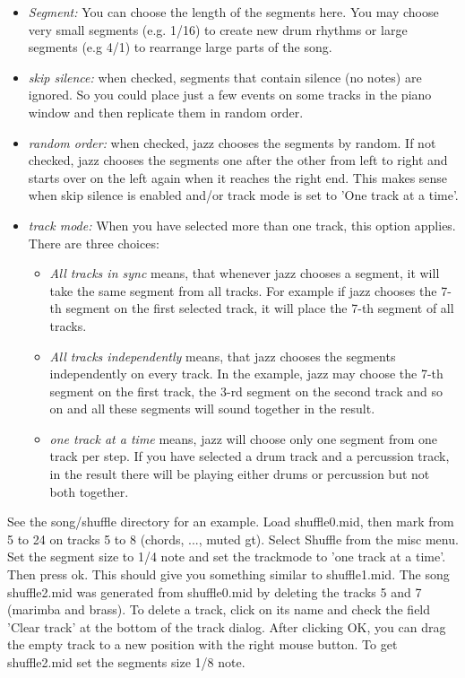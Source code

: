 \documentclass[letterpaper]{report}
\begin{document}
\begin{itemize}

\item {\em Segment:} You can choose the length of the segments here. You may
choose very small segments (e.g. 1/16) to create new drum rhythms or large
segments (e.g 4/1) to rearrange large parts of the song.

\item {\em skip silence:} when checked, segments that contain silence (no notes)
are ignored. So you could place just a few events on some tracks in the piano
window and then replicate them in random order.

\item {\em random order:} when checked, jazz chooses the segments by random. If
not checked, jazz chooses the segments one after the other from left to right
and starts over on the left again when it reaches the right end. This makes
sense when skip silence is enabled and/or track mode is set to
'One track at a time'.

\item {\em track mode:} When you have selected more than one track, this
option applies. There are three choices:

\begin{itemize}

\item {\em All tracks in sync} means, that whenever jazz chooses a segment,
it will take the same segment from all tracks. For example if jazz chooses
the 7-th segment on the first selected track, it will place the 7-th segment
of all tracks.

\item {\em All tracks independently} means, that jazz chooses the segments
independently on every track. In the example, jazz may choose the 7-th
segment on the first track, the 3-rd segment on the second track and so on
and all these segments will sound together in the result.

\item {\em one track at a time} means, jazz will choose only one
segment from one track per step. If you have selected a drum track and
a percussion track, in the result there will be playing either drums or
percussion but not both together.

\end{itemize}

\end{itemize}


See the song/shuffle directory for an example. Load shuffle0.mid, then mark
from 5 to 24 on tracks 5 to 8 (chords, ..., muted gt). Select Shuffle from
the misc menu. Set the segment size to 1/4 note and set the trackmode to 'one
track at a time'. Then press ok. This should give you something similar to
shuffle1.mid. The song shuffle2.mid was generated from shuffle0.mid by deleting
the tracks 5 and 7 (marimba and brass). To delete a track, click on its
name and check the field 'Clear track' at the bottom of the track dialog.
After clicking OK, you can drag the empty track to a new position with
the right mouse button. To get shuffle2.mid set the segments size 1/8 note.
\end{document}
